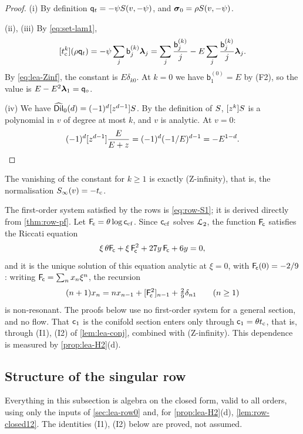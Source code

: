 \begin{proof}
(i) By definition $\mathsf{q}_{t}=-\psi S(v,-\psi)$, and $\boldsymbol{\sigma}_0=\rho S(v,-\psi)$.

(ii), (iii) By \cref{eq:set-lam1},
\[
[t_{\mathrm{c}}^k](\rho\mathsf{q}_{t})=-\psi\sum_j\mathsf{b}_j^{(k)}\boldsymbol{\lambda}_j=\sum_j\frac{\mathsf{b}_j^{(k)}}{j}-E\sum_j\frac{\mathsf{b}_j^{(k)}}{j}\boldsymbol{\lambda}_j.
\]
By \cref{eq:lea-Zinf}, the constant is $E\delta_{k0}$. At $k=0$ we have $\mathsf{b}_1^{(0)}=E$ by (F2), so the value is $E-E^2\boldsymbol{\lambda}_1=\mathsf{q}_{\circ}$.

(iv) We have $\widehat{\mathsf{Dil}}_0(d)=(-1)^d[z^{d-1}]S$. By the definition of $S$, $[z^k]S$ is a polynomial in $v$ of degree at most $k$, and $v$ is analytic. At $v=0$:
\[
(-1)^d[z^{d-1}]\frac{E}{E+z}=(-1)^d(-1/E)^{d-1}=-E^{1-d}.\qedhere
\]
\end{proof}

The vanishing of the constant for $k\ge1$ is exactly (Z-infinity), that is, the normalisation $S_{\infty}(v)=-t_{\mathrm{c}}$.

\begin{rmk}\label{rmk:lea-onshell}
The first-order system satisfied by the rows is \cref{eq:row-S1}; it is derived directly from \cref{thm:row-pf}. Let $\mathsf{F}_{\!\mathsf{c}}=\theta\log\mathsf{c}_{\mathrm{cf}}$. Since $\mathsf{c}_{\mathrm{cf}}$ solves $\mathcal{L}_{2}$, the function $\mathsf{F}_{\!\mathsf{c}}$ satisfies the Riccati equation
\[
\xi\,\theta\mathsf{F}_{\!\mathsf{c}}+\xi\,\mathsf{F}_{\!\mathsf{c}}^2+27y\,\mathsf{F}_{\!\mathsf{c}}+6y=0,
\]
and it is the unique solution of this equation analytic at $\xi=0$, with $\mathsf{F}_{\!\mathsf{c}}(0)=-2/9$: writing $\mathsf{F}_{\!\mathsf{c}}=\sum_nx_n\xi^n$, the recursion
\[
(n+1)x_n=nx_{n-1}+[\mathsf{F}_{\!\mathsf{c}}^2]_{n-1}+\tfrac29\delta_{n1}\qquad(n\ge1)
\]
is non-resonant. The proofs below use no first-order system for a general section, and no flow. That $\mathsf{c}_{1}$ is the conifold section enters only through $\mathsf{c}_{1}=\theta t_{\mathrm{c}}$, that is, through (I1), (I2) of \cref{lem:lea-conj}, combined with (Z-infinity). This dependence is measured by \cref{prop:lea-H2}(d).
\end{rmk}

\subsection{Structure of the singular row}

Everything in this subsection is algebra on the closed form, valid to all orders, using only the inputs of \cref{sec:lea-row0} and, for \cref{prop:lea-H2}(d), \cref{lem:row-closed12}. The identities (I1), (I2) below are proved, not assumed.

